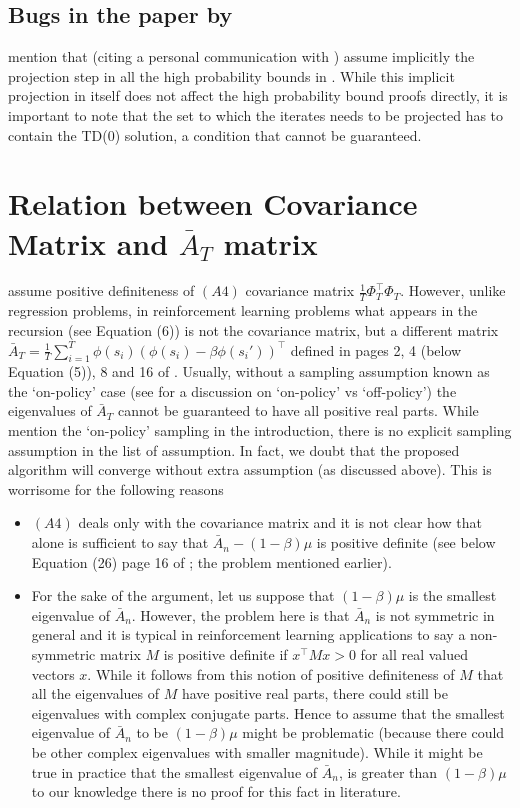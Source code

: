 \documentclass{article}
\begin{document}
\subsection{Bugs in the paper by \citet{lstdicmla}}
\citet{gugan} mention that (citing a personal communication with \citet{lstdicmla}) \cite{lstdicmla} assume implicitly the projection step in all the high probability bounds in \cite{lstdicmla}. While this implicit projection in itself does not affect the high probability bound proofs directly, it is important to note that the set to which the iterates needs to be projected has to contain the TD(0) solution, a condition that cannot be guaranteed.

\section{Relation between Covariance Matrix and $\bar{A}_T$ matrix}
\citet{flstda} assume positive definiteness of \textbf{$(A4)$} covariance matrix $\frac{1}{T}\Phi^\top_T \Phi_T$. However, unlike regression problems, in reinforcement learning problems what appears in the recursion (see Equation (6)) is not the covariance matrix, but a different matrix $\bar{A}_T=\frac{1}{T}\sum_{i=1}^T \phi(s_i)(\phi(s_i)-\beta\phi(s_i'))^\top$ defined in pages 2, 4 (below Equation (5)), 8 and 16 of \cite{flstda}. Usually, without a sampling assumption known as the `on-policy' case (see \cite{gtd} for a discussion on `on-policy' vs `off-policy') the eigenvalues of $\bar{A}_T$ cannot be guaranteed to have all positive real parts. While \citet{flstda} mention the `on-policy' sampling in the introduction, there is no explicit sampling assumption in the list of assumption. In fact, we doubt that the proposed algorithm will converge without extra assumption (as discussed above).
This is worrisome for the following reasons
\begin{itemize}
\item \textbf{$(A4)$} deals only with the covariance matrix and it is not clear how that alone is sufficient to say that $\bar{A}_n-(1-\beta)\mu$ is positive definite (see below Equation (26) page 16 of \cite{flstda}; the problem mentioned earlier).
\item For the sake of the argument, let us suppose that $(1-\beta)\mu$ is the smallest eigenvalue of $\bar{A}_n$. However, the problem here is that $\bar{A}_n$ is not symmetric in general and it is typical in reinforcement learning applications to say a non-symmetric matrix $M$ is positive definite if $x^\top M x>0$ for all real valued vectors $x$. While it follows from this notion of positive definiteness of $M$ that all the eigenvalues of $M$ have positive real parts, there could still be eigenvalues with complex conjugate parts. Hence to assume that the smallest eigenvalue of $\bar{A}_n$ to be $(1-\beta)\mu$ might be problematic (because there could be other complex eigenvalues with smaller magnitude). While it might be true in practice that the smallest eigenvalue of $\bar{A}_n$, is greater than $(1-\beta)\mu$ to our knowledge there is no proof for this fact in literature.
\end{itemize}
\fi
\end{document}
